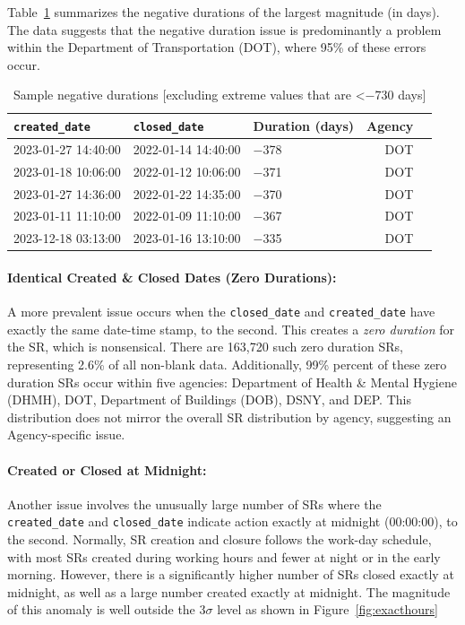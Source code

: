 \documentclass[linenumber]{jdsart}
\begin{document}
Table~\ref{tab:largest-errors} summarizes the 
negative durations of the largest magnitude (in days). The data 
suggests that the negative duration issue is predominantly a problem 
within the Department of Transportation (DOT), where 95\% of these 
errors occur.

\begin{table}[tbp]
  \centering
  \caption{Sample  negative durations [excluding extreme values that are <$-$730 days]}
   \label{tab:largest-errors}
 	\begin{tabular}{l l l r l}
    \toprule
    \texttt{created\_date} & \texttt{closed\_date} & {Duration (days)}  & {Agency} \\
    \midrule
    2023-01-27 14:40:00 & 2022-01-14 14:40:00 & $-$378 & DOT \\
    2023-01-18 10:06:00 & 2022-01-12 10:06:00 & $-$371 & DOT \\
    2023-01-27 14:36:00 & 2022-01-22 14:35:00 & $-$370 & DOT \\
    2023-01-11 11:10:00 & 2022-01-09 11:10:00 & $-$367 & DOT \\
    2023-12-18 03:13:00 & 2023-01-16 13:10:00 & $-$335 & DOT \\
    \bottomrule
    \end{tabular}
 \end{table}

\paragraph{Identical Created \& Closed Dates (Zero Durations):}
A more prevalent issue occurs when the \texttt{closed\_date} and 
\texttt{created\_date} have exactly the same date-time stamp, 
to the second. This creates a \emph{zero duration} for the 
SR, which is nonsensical. There are 163,720 such zero duration 
SRs, representing 2.6\% of all non-blank data. 
Additionally, 99\% percent of these zero duration SRs 
occur within five agencies: Department of Health \& Mental 
Hygiene (DHMH), DOT, Department of Buildings (DOB), DSNY, and 
DEP. This distribution does not mirror the overall SR 
distribution by agency, suggesting an Agency-specific issue.
	
\paragraph{Created or Closed at Midnight:}
Another issue involves the unusually large number of 
SRs where the \texttt{created\_date} and \texttt{closed\_date} 
indicate action exactly at midnight (00:00:00), 
to the second. Normally, SR creation and closure follows 
the work-day schedule, with most SRs created 
during working hours and fewer at night or in the 
early morning. However, there is a significantly higher 
number of SRs closed exactly at midnight, as well 
as a large number created exactly at midnight. The magnitude 
of this anomaly is well outside the 3$\sigma$ level as shown 
in Figure~\ref{fig:exacthours}
\end{document}
